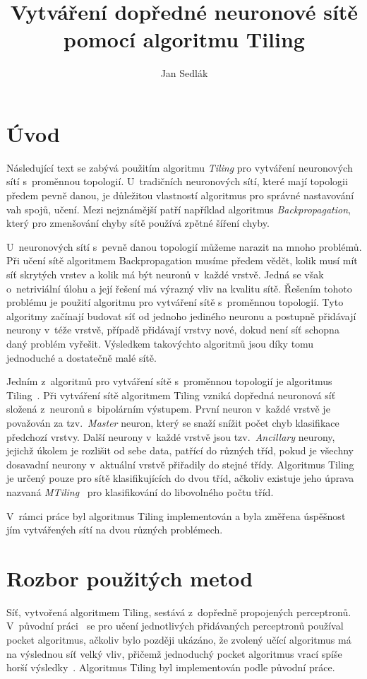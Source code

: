 \documentclass[a4paper, 11pt]{article}
\author{Jan Sedlák}
\title{Vytváření dopředné neuronové sítě pomocí algoritmu Tiling}
\begin{document}
\maketitle
\section*{Úvod}
Následující text se zabývá použitím algoritmu \emph{Tiling} pro vytváření neuronových sítí s~proměnnou topologií. U~tradičních neuronových sítí, které mají topologii předem pevně danou, je důležitou vlastností algoritmus pro správné nastavování vah spojů, učení. Mezi nejznámější patří například algoritmus \emph{Backpropagation}, který pro zmenšování chyby sítě používá zpětné šíření chyby.

U~neuronových sítí s~pevně danou topologií můžeme narazit na mnoho problémů. Při učení sítě algoritmem Backpropagation musíme předem vědět, kolik musí mít síť skrytých vrstev a kolik má být neuronů v~každé vrstvě. Jedná se však o~netriviální úlohu a její řešení má výrazný vliv na kvalitu sítě. Řešením tohoto problému je použití algoritmu pro vytváření sítě s~proměnnou topologií. Tyto algoritmy začínají budovat síť od jednoho jediného neuronu a postupně přidávají neurony v~téže vrstvě, případě při\-dá\-va\-jí vrstvy nové, dokud není síť schopna daný problém vyřešit. Výsledkem takovýchto algoritmů jsou díky tomu jednoduché a dostatečně malé sítě.

Jedním z~algoritmů pro vytváření sítě s~proměnnou topologií je algoritmus Tiling~\cite{mezard}. Při vytváření sítě algoritmem Tiling vzniká dopředná neuronová síť složená z~neuronů s~bipolárním výstupem. První neuron v~každé vrstvě je považován za tzv.\ \emph{Master} neuron, který se snaží snížit počet chyb klasifikace předchozí vrstvy. Další neurony v~každé vrstvě jsou tzv.\ \emph{Ancillary} neurony, jejichž úkolem je rozlišit od sebe data, patřící do různých tříd, pokud je všechny dosavadní neurony v~aktuální vrstvě přiřadily do stejné třídy. Algoritmus Tiling je určený pouze pro sítě klasifikujících do dvou tříd, ačkoliv existuje jeho úprava nazvaná \emph{MTiling}~\cite{mtiling} pro klasifikování do libovolného počtu tříd.

V~rám\-ci práce byl algoritmus Tiling implementován a byla změřena úspěšnost jím vytvářených sítí na dvou různých problémech.

\section*{Rozbor použitých metod}
Síť, vytvořená algoritmem Tiling, sestává z~dopředně propojených per\-cep\-tro\-nů. V~původní práci~\cite{mezard} se pro učení jednotlivých přidávaných perceptronů používal pocket algoritmus, ačkoliv bylo později ukázáno, že zvolený učící algoritmus má na výslednou síť velký vliv, přičemž jednoduchý pocket algoritmus vrací spíše horší výsledky~\cite{twovariants}. Algoritmus Tiling byl implementován podle původní práce.
\end{document}
